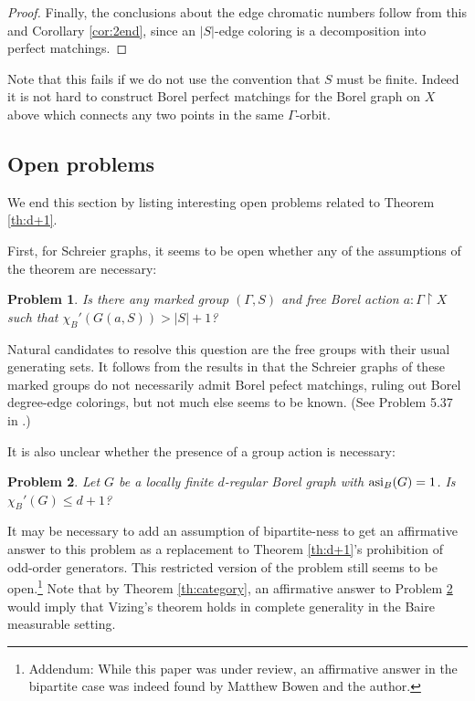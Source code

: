 \documentclass[10pt,a4paper]{article}
\newcommand{\0}{\varnothing}
\newcommand{\asi}{\textnormal{asi}}
\newcommand{\res}{\upharpoonright}
\newtheorem{prob}{Problem}
\begin{document}
\begin{proof}
Finally, the conclusions about the edge chromatic numbers follow from this and Corollary \ref{cor:2end}, since an $|S|$-edge coloring is a decomposition into perfect matchings.

\end{proof}

Note that this fails if we do not use the convention that $S$ must be finite. Indeed it is not hard to construct Borel perfect matchings for the Borel graph on $X$ above which connects any two points in the same $\Gamma$-orbit. 

\subsection{Open problems}

We end this section by listing interesting open problems related to Theorem \ref{th:d+1}.

First, for Schreier graphs, it seems to be open whether any of the assumptions of the theorem are necessary:

\begin{prob}
Is there any marked group $(\Gamma,S)$ and free Borel action $a:\Gamma \res X$ such that $\chi_B'(G(a,S)) > |S| + 1$?
\end{prob}

Natural candidates to resolve this question are the free groups with their usual generating sets. It follows from the results in \cite{M15} that the Schreier graphs of these marked groups do not necessarily admit Borel pefect matchings, ruling out Borel degree-edge colorings, but not much else seems to be known. (See Problem 5.37 in \cite{KM}.)

It is also unclear whether the presence of a group action is necessary:

\begin{prob}\label{prob:nogroup}
Let $G$ be a locally finite $d$-regular Borel graph with $\asi_B(G) = 1$. Is $\chi_B'(G) \leq d+1$?
\end{prob}

It may be necessary to add an assumption of bipartite-ness to get an affirmative answer to this problem as a replacement to Theorem \ref{th:d+1}'s prohibition of odd-order generators. This restricted version of the problem still seems to be open.\footnote{Addendum: While this paper was under review, an affirmative answer in the bipartite case was indeed found by Matthew Bowen and the author.} Note that by Theorem \ref{th:category}, an affirmative answer to Problem \ref{prob:nogroup} would imply that Vizing's theorem holds in complete generality in the Baire measurable setting.
\end{document}
